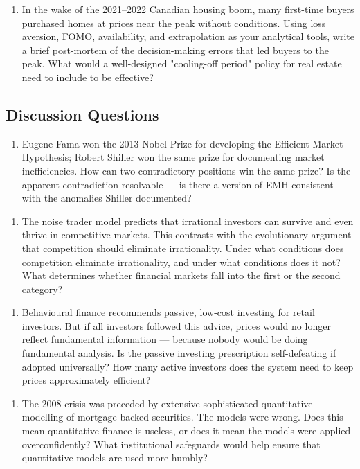 \documentclass[12pt, letterpaper]{article}
\begin{document}
\begin{enumerate}
\item In the wake of the 2021--2022 Canadian housing boom, many first-time buyers purchased homes at prices near the peak without conditions. Using loss aversion, FOMO, availability, and extrapolation as your analytical tools, write a brief post-mortem of the decision-making errors that led buyers to the peak. What would a well-designed "cooling-off period" policy for real estate need to include to be effective?
\end{enumerate}


\subsection{Discussion Questions}


\begin{enumerate}
\item Eugene Fama won the 2013 Nobel Prize for developing the Efficient Market Hypothesis; Robert Shiller won the same prize for documenting market inefficiencies. How can two contradictory positions win the same prize? Is the apparent contradiction resolvable --- is there a version of EMH consistent with the anomalies Shiller documented?
\end{enumerate}

\begin{enumerate}
\item The noise trader model predicts that irrational investors can survive and even thrive in competitive markets. This contrasts with the evolutionary argument that competition should eliminate irrationality. Under what conditions does competition eliminate irrationality, and under what conditions does it not? What determines whether financial markets fall into the first or the second category?
\end{enumerate}

\begin{enumerate}
\item Behavioural finance recommends passive, low-cost investing for retail investors. But if all investors followed this advice, prices would no longer reflect fundamental information --- because nobody would be doing fundamental analysis. Is the passive investing prescription self-defeating if adopted universally? How many active investors does the system need to keep prices approximately efficient?
\end{enumerate}

\begin{enumerate}
\item The 2008 crisis was preceded by extensive sophisticated quantitative modelling of mortgage-backed securities. The models were wrong. Does this mean quantitative finance is useless, or does it mean the models were applied overconfidently? What institutional safeguards would help ensure that quantitative models are used more humbly?
\end{enumerate}
\end{document}
